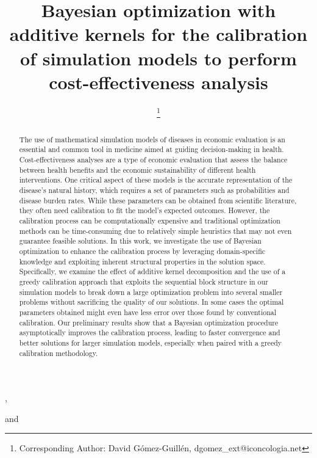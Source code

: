 \documentclass{IOS-Book-Article}
\def\hb{\hbox to 11.5 cm{}}
\begin{document}
	
	\pagestyle{headings}
	\def\thepage{}
	\begin{frontmatter}              %
		
		
		\title{Bayesian optimization with additive kernels for the calibration of simulation models to perform cost-effectiveness analysis}
		
		\markboth{}{April 2023\hb}
		
		\author[A,B]{ %
			\thanks{Corresponding Author: David Gómez-Guillén, dgomez\_ext@iconcologia.net}},
		\author[B,C]{ }
		\author[D]{ }
		and
		\author[D]{ }
		
		\address[A]{Universitat Autònoma de Barcelona (UAB)}
		\address[B]{Institut Català d'Oncologia (ICO) - Institut d'Investigació Biomèdica de Bellvitge (IDIBELL)}
		\address[C]{Consortium for Biomedical Research in Epidemiology and Public Health - CIBERESP. Carlos III Institute of Health}
		\address[D]{Institut d'Investigació en Intel·ligència Artificial - Consell Superior d'Investigacions Científiques (IIIA-CSIC)}
		
		\begin{abstract}
			The use of mathematical simulation models of diseases in economic evaluation is an essential and common tool in medicine aimed at guiding decision-making in health. Cost-effectiveness analyses are a type of economic evaluation that assess the balance between health benefits and the economic sustainability of different health interventions. One critical aspect of these models is the accurate representation of the disease's natural history, which requires a set of parameters such as probabilities and disease burden rates. While these parameters can be obtained from scientific literature, they often need calibration to fit the model's expected outcomes. However, the calibration process can be computationally expensive and traditional optimization methods can be time-consuming due to relatively simple heuristics that may not even guarantee feasible solutions.
			In this work, we investigate the use of Bayesian optimization to enhance the calibration process by leveraging domain-specific knowledge and exploiting inherent structural properties in the solution space. Specifically, we examine the effect of additive kernel decomposition and the use of a greedy calibration approach that exploits the sequential block structure in our simulation models to break down a large optimization problem into several smaller problems without sacrificing the quality of our solutions. In some cases the optimal parameters obtained might even have less error over those found by conventional calibration.
			Our preliminary results show that a Bayesian optimization procedure asymptotically improves the calibration process, leading to faster convergence and better solutions for larger simulation models, especially when paired with a greedy calibration methodology.
		\end{abstract}
		

\end{frontmatter}
\end{document}
